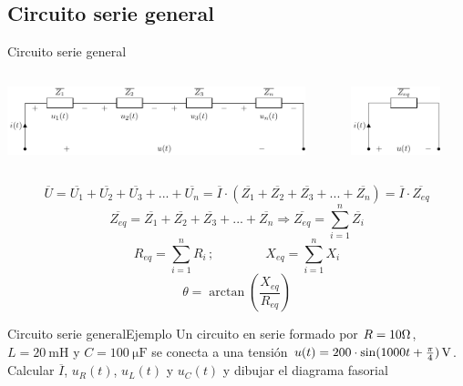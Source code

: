 \documentclass[aspectratio=169, xcolor={usenames,svgnames,dvipsnames}]{beamer}
\begin{document}
\subsection{Circuito serie general}

\begin{frame}{Circuito serie general}
\begin{columns}
\begin{column}{0.7\linewidth}
\begin{center}
    \includegraphics[height=2cm]{../figs/serie_general.pdf}
\end{center}
\end{column}
\begin{column}{0.3\linewidth}
\includegraphics[height=2cm]{../figs/serie_general_eq.pdf}
\end{column}
\end{columns}

\begin{equation*}
		\overline{U}=\overline{U_1}+\overline{U_2}+\overline{U_3}+...+\overline{U_n}=\overline{I} \cdot(\overline{Z_1}+\overline{Z_2}+\overline{Z_3}+...+\overline{Z_n})=\overline{I}\cdot\overline{Z_{eq}}
	\end{equation*}
	\begin{equation*}
		\overline{Z_{eq}}=\overline{Z_1}+\overline{Z_2}+\overline{Z_3}+...+\overline{Z_n}\Rightarrow \boxed{\overline{Z_{eq}}=\sum_{i=1}^n \overline{Z_i}}
	\end{equation*}
	\begin{equation*}
		R_{eq}=\sum_{i=1}^n R_i\,;\qquad \qquad X_{eq}=\sum_{i=1}^n X_i
	\end{equation*}
	\begin{equation*}
		\theta=\arctan\left(\dfrac{X_{eq}}{R_{eq}}\right)
	\end{equation*}
\end{frame}

\begin{frame}{Circuito serie general}{Ejemplo}
    Un circuito en serie formado por $R=\si{10}{\ohm}$, $L=\qty{20}{\milli\henry}$ y $C=\qty{100}{\micro\farad}$ se conecta a una tensión $u(t)=\qty[parse-numbers = false]{200\cdot\sin(1000t+\frac{\pi}{4})}{\volt}$. Calcular $\overline{I}$, ${u_R(t)}$, $u_L(t)$ y $u_C(t)$ y dibujar el diagrama fasorial
\end{frame}
\end{document}
